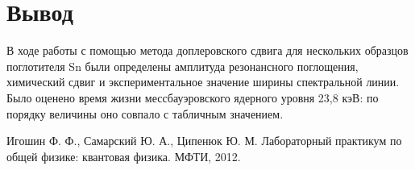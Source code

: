 \documentclass[a4paper, 12pt]{article}
\begin{document}
\section{Вывод}
В ходе работы с помощью метода доплеровского сдвига для нескольких образцов поглотителя Sn были определены амплитуда резонансного поглощения, химический сдвиг и экспериментальное значение ширины спектральной линии. Было оценено время жизни мессбауэровского ядерного уровня 23,8 кэВ: по порядку величины оно совпало с табличным значением.

\begin{thebibliography}{3}
Игошин Ф. Ф., Самарский Ю. А., Ципенюк Ю. М. Лабораторный практикум по общей физике: квантовая физика. МФТИ, 2012.
\end{thebibliography}
\end{document}
